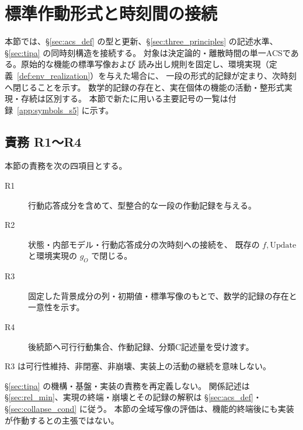 \section{標準作動形式と時刻間の接続}
\label{sec:extended_dynamics}

本節では、\S\ref{sec:acs_def} の型と更新、\S\ref{sec:three_principles} の記述水準、
\S\ref{sec:tipa} の同時刻構造を接続する。
対象は決定論的・離散時間の単一ACSである。原始的な機能の標準写像および
読み出し規則を固定し、環境実現（定義~\ref{def:env_realization}）を与えた場合に、
一段の形式的記録が定まり、次時刻へ閉じることを示す。
数学的記録の存在と、実在個体の機能の活動・整形式実現・存続は区別する。
本節で新たに用いる主要記号の一覧は付録~\ref{app:symbols_s5} に示す。

\subsection{責務 R1〜R4}
\label{subsec:update_dependency}
\label{subsubsec:update_role}
\begin{definition}[本節の責務]
\label{def:s5_responsibilities}
本節の責務を次の四項目とする。
\begin{description}
\item[R1] 行動応答成分を含めて、型整合的な一段の作動記録を与える。
\item[R2] 状態・内部モデル・行動応答成分の次時刻への接続を、
既存の $f,\mathrm{Update}$ と環境実現の $g_O$ で閉じる。
\item[R3] 固定した背景成分の列・初期値・標準写像のもとで、数学的記録の存在と一意性を示す。
\item[R4] 後続節へ可行行動集合、作動記録、分類C記述量を受け渡す。
\end{description}
R3 は可行性維持、非閉塞、非崩壊、実装上の活動の継続を意味しない。
\end{definition}

\begin{remark}[他節との責務境界]
\label{rem:s5_scope_boundary}
\S\ref{sec:tipa} の機構・基盤・実装の責務を再定義しない。
関係記述は \S\ref{sec:rel_min}、実現の終端・崩壊とその記録の解釈は
\S\ref{sec:acs_def}・\S\ref{sec:collapse_cond} に従う。
本節の全域写像の評価は、機能的終端後にも実装が作動するとの主張ではない。
\end{remark}

